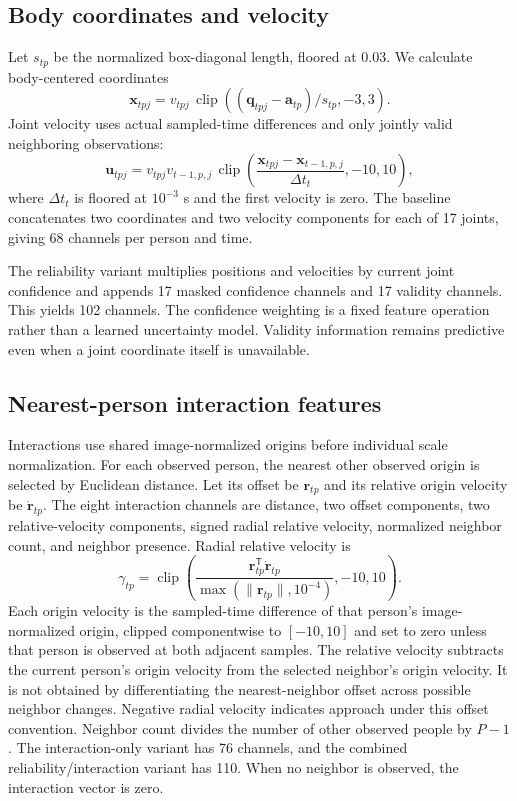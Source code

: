 \subsection{Body coordinates and velocity}
Let $s_{tp}$ be the normalized box-diagonal length, floored at 0.03. We calculate body-centered coordinates
\begin{equation}
\mathbf{x}_{tpj}=v_{tpj}\,\operatorname{clip}
\left((\mathbf{q}_{tpj}-\mathbf{a}_{tp})/s_{tp},-3,3\right).
\end{equation}
Joint velocity uses actual sampled-time differences and only jointly valid neighboring observations:
\begin{equation}
\mathbf{u}_{tpj}=v_{tpj}v_{t-1,p,j}\,
\operatorname{clip}\left(
\frac{\mathbf{x}_{tpj}-\mathbf{x}_{t-1,p,j}}{\Delta t_t},-10,10\right),
\label{eq:velocity}
\end{equation}
where $\Delta t_t$ is floored at $10^{-3}$ s and the first velocity is zero. The baseline concatenates two coordinates and two velocity components for each of 17 joints, giving 68 channels per person and time.

The reliability variant multiplies positions and velocities by current joint confidence and appends 17 masked confidence channels and 17 validity channels. This yields 102 channels. The confidence weighting is a fixed feature operation rather than a learned uncertainty model. Validity information remains predictive even when a joint coordinate itself is unavailable.

\subsection{Nearest-person interaction features}
Interactions use shared image-normalized origins before individual scale normalization. For each observed person, the nearest other observed origin is selected by Euclidean distance. Let its offset be $\mathbf{r}_{tp}$ and its relative origin velocity be $\dot{\mathbf{r}}_{tp}$. The eight interaction channels are distance, two offset components, two relative-velocity components, signed radial relative velocity, normalized neighbor count, and neighbor presence. Radial relative velocity is
\begin{equation}
\gamma_{tp}=\operatorname{clip}
\left(\frac{\mathbf{r}_{tp}^{\mathsf T}\dot{\mathbf{r}}_{tp}}
{\max(\|\mathbf{r}_{tp}\|,10^{-4})},-10,10\right).
\end{equation}
Each origin velocity is the sampled-time difference of that person's image-normalized origin, clipped componentwise to $[-10,10]$ and set to zero unless that person is observed at both adjacent samples. The relative velocity subtracts the current person's origin velocity from the selected neighbor's origin velocity. It is not obtained by differentiating the nearest-neighbor offset across possible neighbor changes. Negative radial velocity indicates approach under this offset convention. Neighbor count divides the number of other observed people by $P-1$. The interaction-only variant has 76 channels, and the combined reliability/interaction variant has 110. When no neighbor is observed, the interaction vector is zero.

